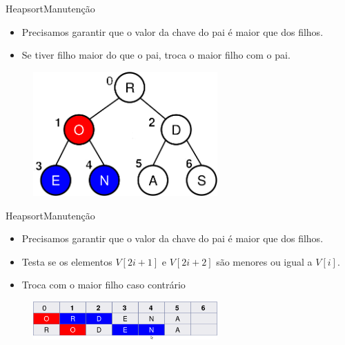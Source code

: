 \documentclass[aspectratio=169]{beamer}
\begin{document}
\begin{frame}{Heapsort}{Manutenção}
\begin{itemize}
\item Precisamos garantir que o valor da chave do pai é maior que dos filhos.
\item Se tiver filho maior do que o pai, troca o maior filho com o pai.
\end{itemize}
\begin{figure}[!h]
  \centering
  \includegraphics[width=200pt]{imgs/manutencao_fila_prioridade2.png}
  \label{fig_manutencao_fila_prioridade2}
\end{figure}
\end{frame}


\begin{frame}{Heapsort}{Manutenção}
\begin{itemize}
\item Precisamos garantir que o valor da chave do pai é maior que dos filhos.
\item Testa se os elementos $V[2i+1]$ e $V[2i+2]$ são menores ou igual a $V[i]$.
\item Troca com o maior filho caso contrário
\end{itemize}
\begin{figure}[!h]
  \centering
  \includegraphics[width=200pt]{imgs/manutencao_fila_prioridade3.png}
  \label{fig_manutencao_fila_prioridade3}
\end{figure}
\end{frame}

\end{document}
